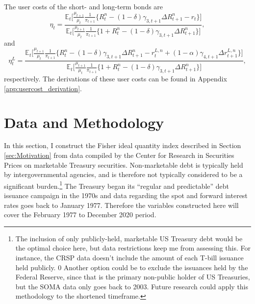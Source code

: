 \documentclass[11pt,a4paper,margin=1.5in]{article}
\begin{document}
The user costs of the short- and long-term bonds are 
\begin{equation}
	\eta_t = \frac{\mathbb{E}_t \Big[ \frac{\mu_{t+1}}{\mu_{t}}\frac{1}{\pi_{t+1}} \Big\{ R^n_t - (1-\delta)\gamma_{3,t+1}\Delta R^n_{t+1} - r_t \Big\}\Big]}{\mathbb{E}_t \Big[ \frac{\mu_{t+1}}{\mu_{t}}\frac{1}{\pi_{t+1}} \Big\{ 1+ R^n_t - (1-\delta)\gamma_{3,t+1}\Delta R^n_{t+1}\Big\}\Big]},
\end{equation}
and
\begin{equation}
\eta^L_t = \frac{\mathbb{E}_t \Big[ \frac{\mu_{t+1}}{\mu_{t}}\frac{1}{\pi_{t+1}} \Big\{ R^n_t  - (1-\delta)\gamma_{3,t+1}\Delta R^n_{t+1} - r^{L,n}_t + (1-\alpha)\gamma_{4,t+1}\Delta r^{L,n}_{t+1}\Big\}\Big]}{\mathbb{E}_t \Big[ \frac{\mu_{t+1}}{\mu_{t}}\frac{1}{\pi_{t+1}} \Big\{ 1+ R^n_t - (1-\delta)\gamma_{3,t+1}\Delta R^n_{t+1}\Big\}\Big]},
\label{eq:usercost_LT}
\end{equation}
respectively.
The derivations of these user costs can be found in Appendix \ref{app:usercost_derivation}.

\section{Data and Methodology}
\label{sec:DataMethodology}
In this section, I construct the Fisher ideal quantity index described in Section \ref{sec:Motivation} from data compiled by the Center for Research in Securities Prices on marketable Treasury securities.
Non-marketable debt is typically held by intergovernmental agencies, and is therefore not typically considered to be a significant burden.\footnote{
	The inclusion of only publicly-held, marketable US Treasury debt would be the optimal choice here, but data restrictions keep me from assessing this.
	For instance, the CRSP data doesn't include the amount of each T-bill issuance held publicly.
0	Another option could be to exclude the issuances held by the Federal Reserve, since that is the primary non-public holder of US Treasuries, but the SOMA data only goes back to 2003.
	Future research could apply this methodology to the shortened timeframe.}
The Treasury began its ``regular and predictable'' debt issuance campaign in the 1970s and data regarding the spot and forward interest rates goes back to January 1977.
Therefore the variables constructed here will cover the February 1977 to December 2020 period.
\end{document}
